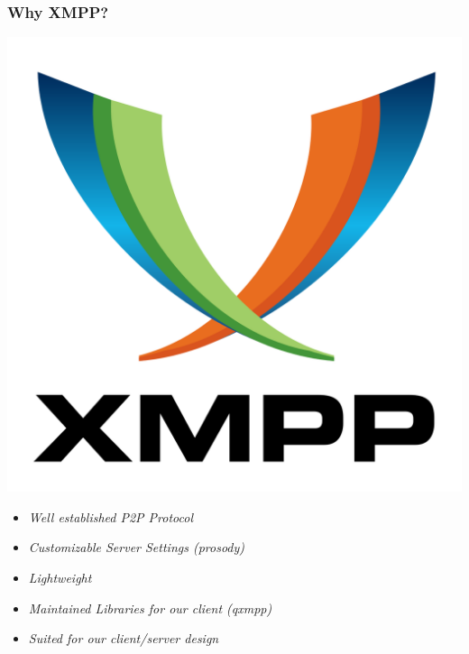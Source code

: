 \documentclass{beamer}
\begin{document}
\begin{frame}
	\frametitle{Why XMPP?}
    \begin{center}
	\includegraphics[scale=0.05]{resources/xmpp.png}
    \end{center}
	\begin{itemize}
		\item \textit{Well established P2P Protocol}
		\item \textit{Customizable Server Settings (prosody)}
		\item \textit{Lightweight}
		\item \textit{Maintained Libraries for our client (qxmpp)}
		\item \textit{Suited for our client/server design}
	\end{itemize}
\end{frame}
\end{document}

